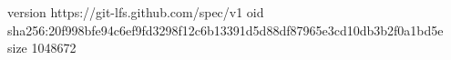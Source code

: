 version https://git-lfs.github.com/spec/v1
oid sha256:20f998bfe94c6ef9fd3298f12c6b13391d5d88df87965e3cd10db3b2f0a1bd5e
size 1048672

